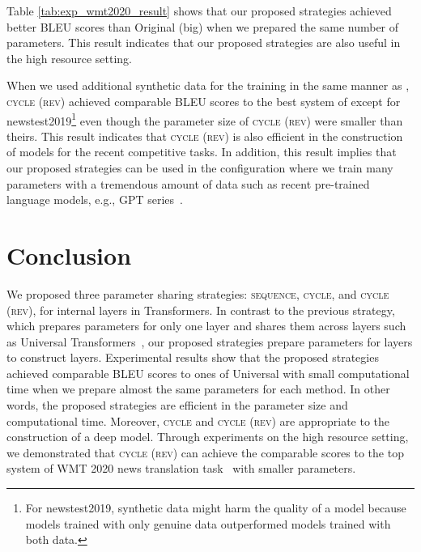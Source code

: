 \documentclass[11pt]{article}
\begin{document}
Table \ref{tab:exp_wmt2020_result} shows that our proposed strategies achieved better BLEU scores than Original (big) when we prepared the same number of parameters.
This result indicates that our proposed strategies are also useful in the high resource setting.


When we used additional synthetic data for the training in the same manner as , \textsc{cycle (rev)} achieved comparable BLEU scores to the best system of  except for newstest2019\footnote{For newstest2019, synthetic data might harm the quality of a model because models trained with only genuine data outperformed models trained with both data.} even though the parameter size of \textsc{cycle (rev)} were smaller than theirs.
This result indicates that \textsc{cycle (rev)} is also efficient in the construction of models for the recent competitive tasks.
In addition, this result implies that our proposed strategies can be used in the configuration where we train many parameters with a tremendous amount of data such as recent pre-trained language models, e.g., GPT series~\cite{NEURIPS2020_1457c0d6}.


\section{Conclusion}
We proposed three parameter sharing strategies: \textsc{sequence}, \textsc{cycle}, and \textsc{cycle (rev)}, for internal layers in Transformers.
In contrast to the previous strategy, which prepares parameters for only one layer and shares them across layers such as Universal Transformers~\cite{dehghani2019}, our proposed strategies prepare parameters for  layers to construct  layers.
Experimental results show that the proposed strategies achieved comparable BLEU scores to ones of Universal with small computational time when we prepare almost the same parameters for each method.
In other words, the proposed strategies are efficient in the parameter size and computational time.
Moreover, \textsc{cycle} and \textsc{cycle (rev)} are appropriate to the construction of a deep model.
Through experiments on the high resource setting, we demonstrated that \textsc{cycle (rev)} can achieve the comparable scores to the top system of WMT 2020 news translation task~\cite{kiyono-etal-2020-tohoku} with smaller parameters.
\end{document}
